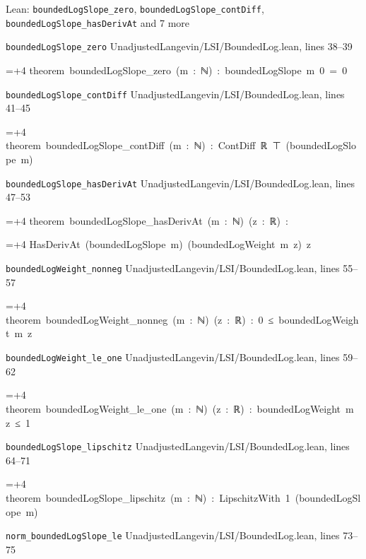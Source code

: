 \documentclass[11pt,a4paper]{article}
\newlength{\leancharwidth}
\newenvironment{leancode}{\par\smallskip\begingroup\ttfamily\footnotesize\raggedright
  \settowidth{\leancharwidth}{M}\setlength{\parskip}{0pt}\setlength{\parindent}{0pt}
  \frenchspacing}{\par\endgroup\smallskip}
\newcommand{\leanline}[2]{\hangindent=\dimexpr#1\leancharwidth+4\leancharwidth\relax
  \hangafter=1\noindent\hspace*{#1\leancharwidth}#2\par}
\newcommand{\leansource}[1]{\par{\footnotesize\color{leanmuted}#1}\par}
\begin{document}
\begin{leanbox}{Lean: \texttt{boundedLogSlope\_\allowbreak{}zero}, \texttt{boundedLogSlope\_\allowbreak{}contDiff}, \texttt{boundedLogSlope\_\allowbreak{}hasDerivAt} and 7 more}
\leansource{\texttt{boundedLogSlope\_\allowbreak{}zero} \quad UnadjustedLangevin/\allowbreak{}LSI/\allowbreak{}BoundedLog.lean, lines 38–39}
\begin{leancode}
\leanline{0}{theorem\ boundedLogSlope\_zero\ (m\ :\ ℕ)\ :\ boundedLogSlope\ m\ 0\ =\ 0}
\end{leancode}
\leansource{\texttt{boundedLogSlope\_\allowbreak{}contDiff} \quad UnadjustedLangevin/\allowbreak{}LSI/\allowbreak{}BoundedLog.lean, lines 41–45}
\begin{leancode}
\leanline{0}{theorem\ boundedLogSlope\_contDiff\ (m\ :\ ℕ)\ :\ ContDiff\ ℝ\ ⊤\ (boundedLogSlope\ m)}
\end{leancode}
\leansource{\texttt{boundedLogSlope\_\allowbreak{}hasDerivAt} \quad UnadjustedLangevin/\allowbreak{}LSI/\allowbreak{}BoundedLog.lean, lines 47–53}
\begin{leancode}
\leanline{0}{theorem\ boundedLogSlope\_hasDerivAt\ (m\ :\ ℕ)\ (z\ :\ ℝ)\ :}
\leanline{4}{HasDerivAt\ (boundedLogSlope\ m)\ (boundedLogWeight\ m\ z)\ z}
\end{leancode}
\leansource{\texttt{boundedLogWeight\_\allowbreak{}nonneg} \quad UnadjustedLangevin/\allowbreak{}LSI/\allowbreak{}BoundedLog.lean, lines 55–57}
\begin{leancode}
\leanline{0}{theorem\ boundedLogWeight\_nonneg\ (m\ :\ ℕ)\ (z\ :\ ℝ)\ :\ 0\ ≤\ boundedLogWeight\ m\ z}
\end{leancode}
\leansource{\texttt{boundedLogWeight\_\allowbreak{}le\_\allowbreak{}one} \quad UnadjustedLangevin/\allowbreak{}LSI/\allowbreak{}BoundedLog.lean, lines 59–62}
\begin{leancode}
\leanline{0}{theorem\ boundedLogWeight\_le\_one\ (m\ :\ ℕ)\ (z\ :\ ℝ)\ :\ boundedLogWeight\ m\ z\ ≤\ 1}
\end{leancode}
\leansource{\texttt{boundedLogSlope\_\allowbreak{}lipschitz} \quad UnadjustedLangevin/\allowbreak{}LSI/\allowbreak{}BoundedLog.lean, lines 64–71}
\begin{leancode}
\leanline{0}{theorem\ boundedLogSlope\_lipschitz\ (m\ :\ ℕ)\ :\ LipschitzWith\ 1\ (boundedLogSlope\ m)}
\end{leancode}
\leansource{\texttt{norm\_\allowbreak{}boundedLogSlope\_\allowbreak{}le} \quad UnadjustedLangevin/\allowbreak{}LSI/\allowbreak{}BoundedLog.lean, lines 73–75}
\begin{leancode}

\end{leancode}
\end{leanbox}
\end{document}
